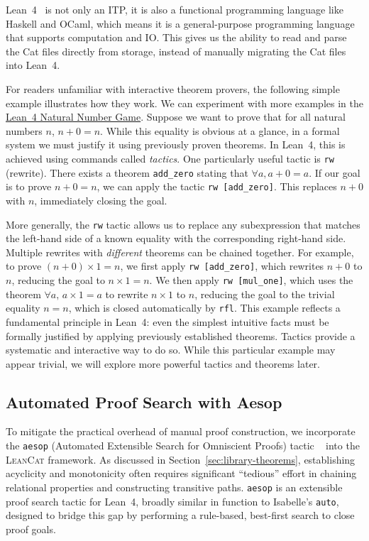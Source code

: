 Lean~4~\citep{deMoura2021lean4} is not only an ITP, it is also a functional programming language like Haskell and OCaml, which means it is a general-purpose programming language that supports computation and IO. This gives us the ability to read and parse the Cat files directly from storage, instead of manually migrating the Cat files into Lean~4.

For readers unfamiliar with interactive theorem provers, the following simple example illustrates how they work. We can experiment with more examples in the \href{https://adam.math.hhu.de/#/g/leanprover-community/nng4/}{Lean~4 Natural Number Game}. Suppose we want to prove that for all natural numbers \(n\), \(n + 0 = n\). While this equality is obvious at a glance, in a formal system we must justify it using previously proven theorems. In Lean~4, this is achieved using commands called \emph{tactics}. One particularly useful tactic is \texttt{rw} (rewrite). There exists a theorem \texttt{add\_zero} stating that \(\forall a, a + 0 = a\). If our goal is to prove \(n + 0 = n\), we can apply the tactic \texttt{rw [add\_zero]}. This replaces \(n + 0\) with \(n\), immediately closing the goal.


More generally, the \texttt{rw} tactic allows us to replace any subexpression that matches the left-hand side of a known equality with the corresponding right-hand side. Multiple rewrites with \emph{different} theorems can be chained together. For example, to prove \((n + 0) \times 1 = n\), we first apply \texttt{rw [add\_zero]}, which rewrites \(n + 0\) to \(n\), reducing the goal to \(n \times 1 = n\). We then apply \texttt{rw [mul\_one]}, which uses the theorem \(\forall a,\, a \times 1 = a\) to rewrite \(n \times 1\) to \(n\), reducing the goal to the trivial equality \(n = n\), which is closed automatically by \texttt{rfl}. This example reflects a fundamental principle in Lean~4: even the simplest intuitive facts must be formally justified by applying previously established theorems. Tactics provide a systematic and interactive way to do so. While this particular example may appear trivial, we will explore more powerful tactics and theorems later.

\subsection{Automated Proof Search with Aesop}
\label{subsec:aesop}

To mitigate the practical overhead of manual proof construction, we incorporate the \texttt{aesop} (Automated Extensible Search for Omniscient Proofs) tactic ~\citep{ayers2023aesop} into the \textsc{LeanCat} framework. As discussed in Section~\ref{sec:library-theorems}, establishing acyclicity and monotonicity often requires significant ``tedious'' effort in chaining relational properties and constructing transitive paths. \texttt{aesop} is an extensible proof search tactic for Lean~4, broadly similar in function to Isabelle's \texttt{auto}, designed to bridge this gap by performing a rule-based, best-first search to close proof goals.


